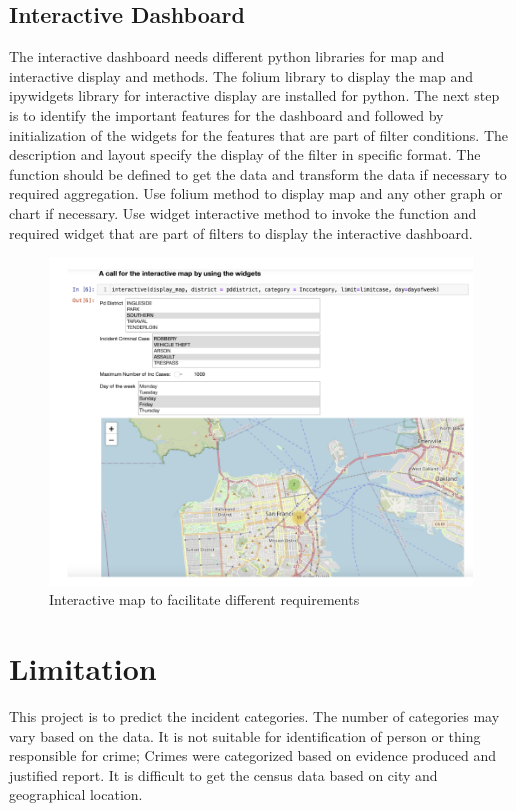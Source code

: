\documentclass[conference,final,]{IEEEtran}
\begin{document}
\subsection{Interactive Dashboard}\label{interactive-dashboard}

The interactive dashboard needs different python libraries for map and
interactive display and methods. The folium library to display the map
and ipywidgets library for interactive display are installed for python.
The next step is to identify the important features for the dashboard
and followed by initialization of the widgets for the features that are
part of filter conditions. The description and layout specify the
display of the filter in specific format. The function should be defined
to get the data and transform the data if necessary to required
aggregation. Use folium method to display map and any other graph or
chart if necessary. Use widget interactive method to invoke the function
and required widget that are part of filters to display the interactive
dashboard.

\begin{figure}

{\centering \includegraphics[width=0.5\linewidth]{img/fig14b} 

}

\caption{Interactive map to facilitate different requirements}\label{fig:unnamed-chunk-14}
\end{figure}

\section{Limitation}\label{limitation}

This project is to predict the incident categories. The number of
categories may vary based on the data. It is not suitable for
identification of person or thing responsible for crime; Crimes were
categorized based on evidence produced and justified report. It is
difficult to get the census data based on city and geographical
location.
\end{document}

